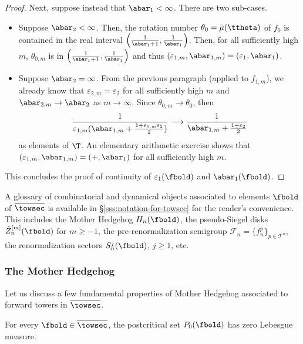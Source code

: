 \documentclass{amsart}
\begin{document}
\begin{proof}
    Next, suppose instead that $\abar_1 < \infty$.
    There are two sub-cases.
    \begin{itemize}
        \item Suppose $\abar_2 < \infty$.
        Then, the rotation number $\theta_0 = \bar{\mu}(\ttheta)$ of $f_0$ is contained in the real interval $\left( \frac{1}{\abar_1+1}, \frac{1}{\abar_1} \right)$.
        Then, for all sufficiently high $m$, $\theta_{0,m}$ is in $\left( \frac{1}{\abar_1+1}, \frac{1}{\abar_1} \right)$ and thus $(\varepsilon_{1,m}, \abar_{1,m}) = (\varepsilon_1, \abar_1)$.
        \item Suppose $\abar_2 = \infty$.
        From the previous paragraph (applied to $f_{1,m}$), we already know that $\varepsilon_{2,m} = \varepsilon_{2}$ for all sufficiently high $m$ and $\abar_{2,m} \to \abar_2$ as $m \to \infty$.
        Since $\theta_{0,m} \to \theta_0$, then
        \[
            \frac{1}{\varepsilon_{1,m}(\abar_{1,m}+ \frac{1+\varepsilon_{1,m}\varepsilon_2}{2})} \xrightarrow[\quad]{} \frac{1}{\abar_{1,m}+ \frac{1+\varepsilon_2}{2}}
        \]
        as elements of $\T$.
        An elementary arithmetic exercise shows that $(\varepsilon_{1,m}, \abar_{1,m}) = (+,\abar_1)$ for all sufficiently high $m$.
    \end{itemize}
    This concludes the proof of continuity of $\varepsilon_1(\fbold)$ and $\abar_1(\fbold)$.
\end{proof}

A glossary of combinatorial and dynamical objects associated to elements $\fbold$ of $\overline{\towsec}$ is available in \S\ref{sss:notation-for-towsec} for the reader's convenience.
This includes the Mother Hedgehog $H_n(\fbold)$, the pseudo-Siegel disks $\hat{Z}_n^{[m]}(\fbold)$ for $m \geq -1$, the pre-renormalization semigroup $\mathcal{F}_n = \{f_n^p\}_{p \in \mathcal{T}^n}$, the renormalization sectors $S_n^j(\fbold)$, $j \geq 1$, etc.

\subsubsection{The Mother Hedgehog}

Let us discuss a few fundamental properties of Mother Hedgehog associated to forward towers in $\overline{\towsec}$.

\begin{theorem}
\label{thm:zero-area}
    For every $\fbold \in \overline{\towsec}$, the postcritical set $P_0(\fbold)$ has zero Lebesgue measure.
\end{theorem}
\end{document}
